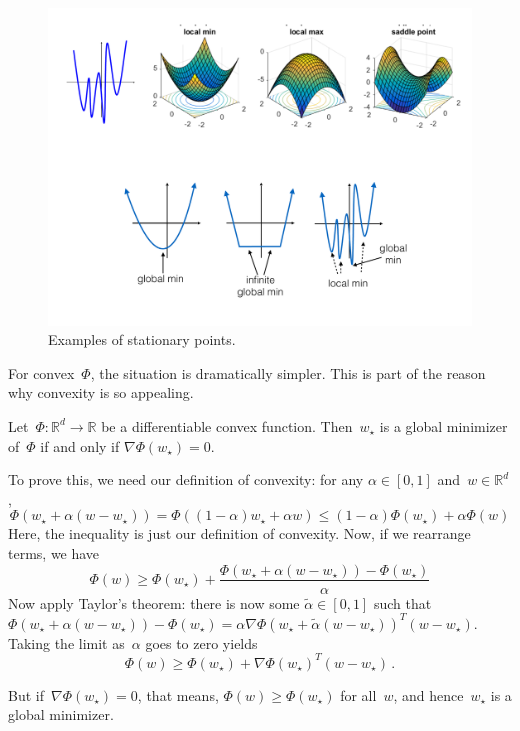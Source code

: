 \documentclass{tufte-book}
\begin{document}
\begin{figure}
\centering
\includegraphics[width=1\textwidth,height=\textheight]{assets/stationary_points}
\caption{Examples of stationary points.}
\end{figure}

For convex~\(\Phi\), the situation is dramatically simpler. This is part
of the reason why convexity is so appealing.

\begin{Proposition}

Let~\(\Phi:\mathbb{R}^d\rightarrow \mathbb{R}\) be a differentiable
convex function. Then~\(w_\star\) is a global minimizer of~\(\Phi\) if
and only if \(\nabla \Phi(w_\star)=0\).

\end{Proposition}

\begin{Proof}

To prove this, we need our definition of convexity: for any
\(\alpha \in [0,1]\) and~\(w\in\mathbb{R}^d\), \[
    \Phi(w_\star + \alpha(w-w_\star)) =  \Phi((1-\alpha)w_\star + \alpha w) \leq (1-\alpha) \Phi(w_\star) + \alpha \Phi(w)
\] Here, the inequality is just our definition of convexity. Now, if we
rearrange terms, we have \[
    \Phi(w) \geq \Phi(w_\star) + \frac{\Phi(w_\star + \alpha(w-w_\star)) - \Phi(w_\star)}{\alpha}
\] Now apply Taylor's theorem: there is now some
\(\tilde{\alpha}\in[0,1]\) such that
\(\Phi(w_\star + \alpha(w-w_\star)) - \Phi(w_\star)=\alpha \nabla \Phi(w_\star+ \tilde{\alpha}(w-w_\star))^T(w-w_\star)\).
Taking the limit as~\(\alpha\) goes to zero yields \[
    \Phi(w) \geq \Phi(w_\star) +\nabla \Phi(w_\star)^T(w-w_\star)\,.
\]

But if~\(\nabla \Phi(w_\star)=0\), that means,
\(\Phi(w) \geq \Phi(w_\star)\) for all~\(w\), and hence~\(w_\star\) is a
global minimizer.

\end{Proof}
\end{document}
